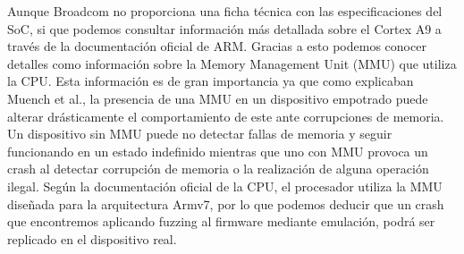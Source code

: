 Aunque Broadcom no proporciona una ficha técnica con las especificaciones del SoC, 
si que podemos consultar información más detallada sobre el Cortex A9 a través de la documentación oficial de ARM\cite{cortexA9}. Gracias a esto podemos 
conocer detalles como información sobre la Memory Management Unit (MMU) que utiliza la CPU. Esta información es de gran importancia ya que como explicaban
Muench et al.\cite{Muench2018}, la presencia de una MMU en un dispositivo empotrado puede alterar drásticamente el comportamiento de este ante corrupciones de 
memoria. Un dispositivo sin MMU puede no detectar fallas de memoria y seguir funcionando en un estado indefinido mientras que uno con MMU provoca un 
crash al detectar corrupción de memoria o la realización de alguna operación ilegal. Según la documentación oficial de la CPU, el procesador utiliza la MMU 
diseñada para la arquitectura Armv7, por lo que podemos deducir que un crash que encontremos aplicando fuzzing al firmware mediante emulación, podrá ser replicado
en el dispositivo real.

